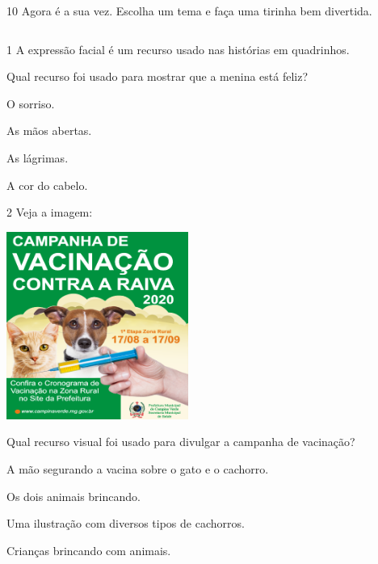\num{10} Agora é a sua vez. Escolha um tema e faça uma tirinha bem divertida.

\begin{longtable}[]{@{}ll@{}}
\toprule
&\tabularnewline
\bottomrule
\end{longtable}


\num{1} A expressão facial é um recurso usado nas histórias em quadrinhos.


Qual recurso foi usado para mostrar que a menina está feliz?

\begin{escolha}
\item O sorriso.

\item As mãos abertas.

\item As lágrimas.

\item A cor do cabelo.
\end{escolha}

\num{2} Veja a imagem:

\includegraphics[width=2.34507in,height=2.41801in]{media/image137.png}


Qual recurso visual foi usado para divulgar a campanha de vacinação?

\begin{escolha}
\item A mão segurando a vacina sobre o gato e o cachorro.

\item Os dois animais brincando.

\item Uma ilustração com diversos tipos de cachorros.

\item Crianças brincando com animais.
\end{escolha}

